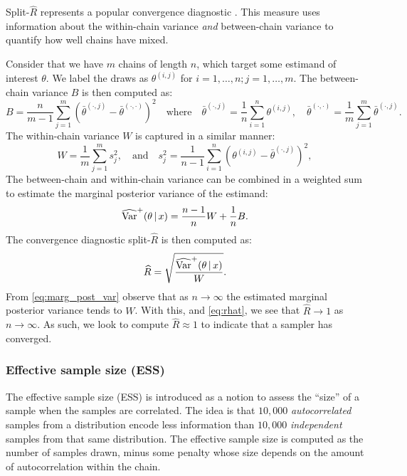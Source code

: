 Split-$\widehat{R}$ represents a popular convergence diagnostic
\parencite{gelman13}. This measure uses information about the within-chain
variance \emph{and} between-chain variance to quantify how well chains have
mixed.

Consider that we have $m$ chains of length $n$, which target some estimand of
interest $\theta$. We label the draws as $\theta^{(i, j)}$ for $i=1,\ldots,n;
j=1,\ldots,m$. The between-chain variance $B$ is then computed as:
\begin{equation*}
  B = \frac{n}{m - 1} \sum_{j=1}^m (\bar{\theta}^{(\cdot, j)} - \bar{\theta}^{(\cdot,\cdot)})^2
    \quad \text{where} \quad
    \bar{\theta}^{(\cdot, j)} = \frac{1}{n} \sum_{i=1}^{n} \theta^{(i, j)},
    \quad
    \bar{\theta}^{(\cdot, \cdot)} = \frac{1}{m} \sum_{j=1}^m \bar{\theta}^{(\cdot, j)}.
\end{equation*}
The within-chain variance $W$ is captured in a similar manner:
\begin{equation*}
  W = \frac{1}{m} \sum_{j=1}^m s_j^2,
    \quad \text{and} \quad
    s_j^2 = \frac{1}{n-1} \sum_{i=1}^{n}(\theta^{(i, j)} - \bar{\theta}^{(\cdot,j)})^2,
\end{equation*}
The between-chain and within-chain variance can be combined in a weighted sum
to estimate the marginal posterior variance of the estimand:
\begin{equation}
  \label{eq:marg_post_var}
  \widehat{\text{Var}}^+ (\theta \,|\, x) = \frac{n-1}{n} W + \frac{1}{n} B.
\end{equation}
The convergence diagnostic split-$\widehat{R}$ is then computed as:
\begin{equation}
  \label{eq:rhat}
  \widehat{R} = \sqrt{\frac{\widehat{\text{Var}}^+ (\theta \,|\, x)}{W}}.
\end{equation}
From \cref{eq:marg_post_var} observe that as $n\rightarrow\infty$ the estimated
marginal posterior variance tends to $W$. With this, and \cref{eq:rhat}, we see
that $\widehat{R}\rightarrow1$ as $n\rightarrow\infty$. As such, we look to
compute $\widehat{R}\approx1$ to indicate that a sampler has converged.

\subsubsection{Effective sample size (ESS)}

The effective sample size (ESS) is introduced as a notion to assess the
``size'' of a sample when the samples are correlated. The idea is that $10,000$
\emph{autocorrelated} samples from a distribution encode less information than
$10,000$ \emph{independent} samples from that same distribution. The effective
sample size is computed as the number of samples drawn, minus some penalty
whose size depends on the amount of autocorrelation within the chain.

